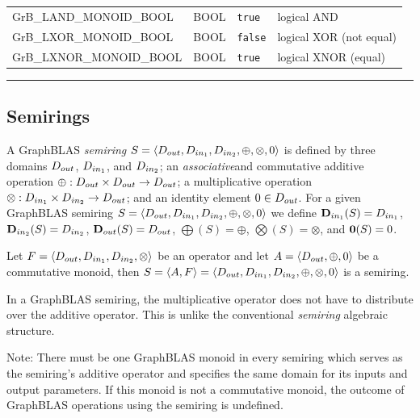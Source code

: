 \begin{table}
\begin{threeparttable}
\begin{tabular}{l|l|l|l}
{\sf GrB\_LAND\_MONOID\_BOOL}  & {\sf BOOL}  & {\tt true}    & logical AND \\
{\sf GrB\_LXOR\_MONOID\_BOOL}  & {\sf BOOL}  & {\tt false}   & logical XOR (not equal) \\
{\sf GrB\_LXNOR\_MONOID\_BOOL} & {\sf BOOL}  & {\tt true}    & logical XNOR (equal) \\
\end{tabular}
\hrule
{}
\end{threeparttable}
\end{table}

\subsection{Semirings}

A GraphBLAS \emph{semiring}
$S=\langle \mbox{$D_{out}$}, \mbox{$D_{in_{1}}$}, \mbox{$D_{in_{2}}$}, \oplus, \otimes, 0 \rangle$ is defined by
three domains $\mbox{$D_{out}$}$, $\mbox{$D_{in_{1}}$}$, and $\mbox{$D_{in_{2}}$}$; an \emph{associative}\footnotemark[\value{footnote}]
and commutative
additive operation $\oplus : \mbox{$D_{out}$} \times \mbox{$D_{out}$} \rightarrow \mbox{$D_{out}$}$; 
a multiplicative operation $\otimes : \mbox{$D_{in_{1}}$} \times \mbox{$D_{in_{2}}$} \rightarrow
\mbox{$D_{out}$}$; and an identity element $0 \in \mbox{$D_{out}$}$.
For a given GraphBLAS semiring $S=\langle \mbox{$D_{out}$}, \mbox{$D_{in_{1}}$},
\mbox{$D_{in_{2}}$}, \oplus,\otimes,0 \rangle$ we define $\mbox{$\mathbf{D}_{in_{1}}$}(S) = \mbox{$D_{in_{1}}$}$,
$\mbox{$\mathbf{D}_{in_{2}}$}(S) = \mbox{$D_{in_{2}}$}$, $\mbox{$\mathbf{D}_{out}$}(S) = \mbox{$D_{out}$}$, $\mathbf{\bigoplus}(S) =
\oplus$, $\mathbf{\bigotimes}(S) = \otimes$, and ${\bf 0}(S) = 0$. 

Let $F = \langle \mbox{$D_{out}$},\mbox{$D_{in_{1}}$},\mbox{$D_{in_{2}}$},\otimes \rangle$ be an operator
and let $A = \langle \mbox{$D_{out}$},\oplus,0 \rangle$ be a commutative monoid,
then $S= \langle A,F \rangle = \langle \mbox{$D_{out}$},\mbox{$D_{in_{1}}$},\mbox{$D_{in_{2}}$},\oplus,\otimes,0 \rangle$
is a semiring.

In a GraphBLAS semiring, the multiplicative operator does not have to distribute over the additive operator. 
This is unlike the conventional \emph{semiring} algebraic structure.

Note: There must be one GraphBLAS monoid in every semiring which 
serves as the semiring's additive operator and  
specifies the same domain for its inputs and output parameters. 
If this monoid is not a commutative monoid, the outcome of GraphBLAS
operations using the semiring is undefined.

